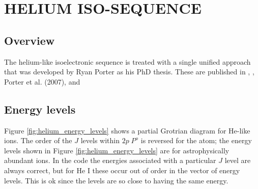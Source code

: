 \chapter{HELIUM ISO-SEQUENCE}

\section{Overview}

The helium-like isoelectronic sequence is treated with a single unified
approach that was developed by Ryan Porter as his PhD thesis.  These are
published in \citet{Bauman2005}, \citet{Porter2005}, Porter et al.
(2007), and \citet{PorterFerland2007}

\section{Energy levels}

Figure \ref{fig:helium_energy_levels} shows a partial
Grotrian diagram for He-like ions.
The order of the $J$ levels within $2p\;{P^o}$
is reversed for the atom; the energy levels shown in
Figure \ref{fig:helium_energy_levels} are for
astrophysically abundant ions.  In the code the energies associated with
a particular $J$ level are always correct, but for He I these occur out of
order in the vector of energy levels.  This is ok since the levels are so
close to having the same energy.

